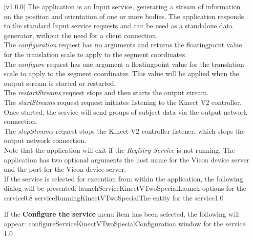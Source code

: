 [v1.0.0]
The  application is an Input service,
generating a stream of information on the position and orientation of one or more bodies.
The application responds to the standard Input service requests and can be used as a
standalone data generator, without the need for a client connection.\\

The \emph{configuration} request has no arguments and returns the floating\longDash{}point
value for the translation scale to apply to the segment coordinates.\\

The \emph{configure} request has one argument \longDash{} a floating\longDash{}point
value for the translation scale to apply to the segment coordinates.
This value will be applied when the output stream is started or restarted.\\ 

The \emph{restartStreams} request stops and then starts the output stream.\\

The \emph{startStreams} request request initiates listening to the Kinect V2 controller.
Once started, the service will send groups of subject data via the output \yarp{} network
connection.\\

The \emph{stopStreams} request stops the Kinect V2 controller listener, which stops the
output \yarp{} network connection.\\ 

Note that the application will exit if the \emph{Registry Service} is not running.
The application has two optional arguments \longDash{} the host name for the Vicon device
server and the port for the Vicon device server.
\insertAppParameters
\condPage
\insertTagDescription{\KVtwoSI}
\insertInputServiceComment\\

\insertStandardServiceCommands
\secondaryEnd
{}
If the service is selected for execution from within the \emph{\MMMU} application, the
following dialog will be presented:
%
{launchServiceKinectVTwoSpecial}{Launch options for the \KVtwoSI{} service}{0.8}
\condPage
{}%
{serviceRunningKinectVTwoSpecial}{The \emph{\MMMU} entity for the \KVtwoSI{} service}{1.0}

If the \textbf{Configure the service} menu item has been selected, the following will
appear:
%
{configureServiceKinectVTwoSpecial}{Configuration window for the \emph{\KVtwoSI} service}%
{1.0}
\secondaryEnd
\primaryEnd{}
